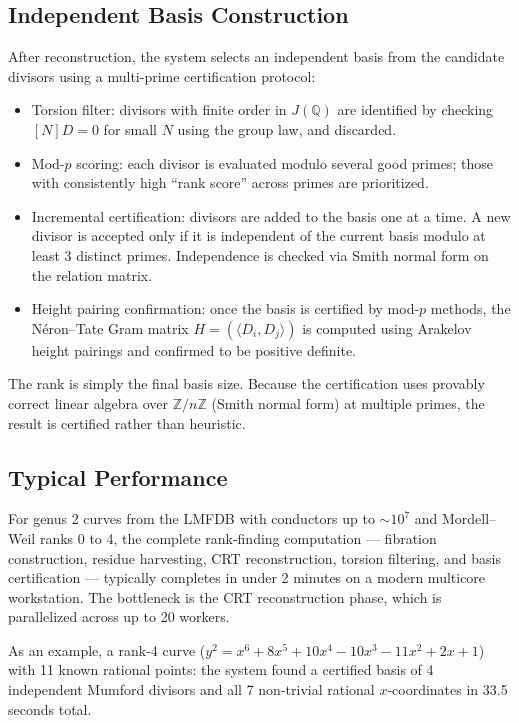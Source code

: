\documentclass[11pt, a4paper]{article}
\begin{document}
\subsection{Independent Basis Construction}

After reconstruction, the system selects an independent basis from the candidate divisors using a multi-prime certification protocol:

\begin{itemize}[label={\textbullet}]
    \item Torsion filter: divisors with finite order in $J(\mathbb{Q})$ are identified by checking $[N]D = 0$ for small $N$ using the group law, and discarded.
    \item Mod-$p$ scoring: each divisor is evaluated modulo several good primes; those with consistently high ``rank score'' across primes are prioritized.
    \item Incremental certification: divisors are added to the basis one at a time. A new divisor is accepted only if it is independent of the current basis modulo at least 3 distinct primes. Independence is checked via Smith normal form on the relation matrix.
    \item Height pairing confirmation: once the basis is certified by mod-$p$ methods, the N\'eron--Tate Gram matrix $H = (\langle D_i, D_j \rangle)$ is computed using Arakelov height pairings and confirmed to be positive definite.
\end{itemize}

The rank is simply the final basis size. Because the certification uses provably correct linear algebra over $\mathbb{Z}/n\mathbb{Z}$ (Smith normal form) at multiple primes, the result is certified rather than heuristic.

\subsection{Typical Performance}

For genus 2 curves from the LMFDB with conductors up to $\sim 10^7$ and Mordell--Weil ranks 0 to 4, the complete rank-finding computation --- fibration construction, residue harvesting, CRT reconstruction, torsion filtering, and basis certification --- typically completes in under 2 minutes on a modern multicore workstation. The bottleneck is the CRT reconstruction phase, which is parallelized across up to 20 workers.

As an example, a rank-4 curve ($y^2 = x^6 + 8x^5 + 10x^4 - 10x^3 - 11x^2 + 2x + 1$) with 11 known rational points: the system found a certified basis of 4 independent Mumford divisors and all 7 non-trivial rational $x$-coordinates in 33.5 seconds total.
\end{document}
